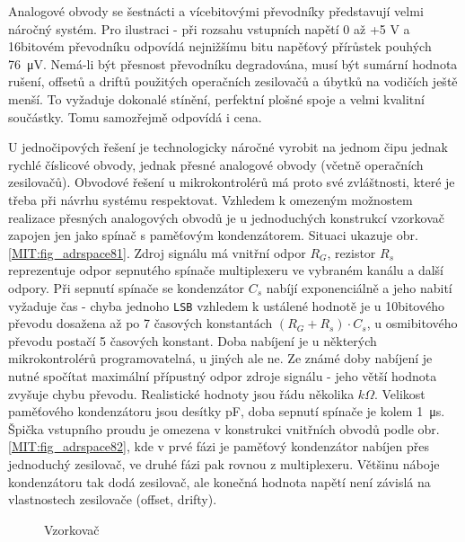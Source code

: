       Analogové obvody se šestnácti a vícebitovými převodníky představují velmi náročný systém. Pro 
      ilustraci - při rozsahu vstupních napětí 0 až +5 V a 16bitovém převodníku odpovídá nejnižšímu 
      bitu napěťový přírůstek pouhých \qty{76}{\micro\volt}. Nemá-li být přesnost převodníku 
      degradována, musí být sumární hodnota rušení, offsetů a driftů použitých operačních 
      zesilovačů a úbytků na vodičích ještě  menší. To vyžaduje dokonalé stínění, perfektní plošné 
      spoje a velmi kvalitní součástky. Tomu samozřejmě odpovídá i cena.
      
      U jednočipových řešení je technologicky náročné vyrobit na jednom čipu jednak rychlé 
      číslicové obvody, jednak přesné analogové obvody (včetně operačních zesilovačů). Obvodové 
      řešení u mikrokontrolérů má  proto své zvláštnosti, které je třeba při návrhu systému 
      respektovat. Vzhledem k omezeným možnostem  realizace přesných analogových obvodů je u 
      jednoduchých konstrukcí vzorkovač zapojen jen jako spínač s paměťovým kondenzátorem. Situaci 
      ukazuje obr. \ref{MIT:fig_adrspace81}. Zdroj signálu má vnitřní odpor \(R_G\), rezistor 
      \(R_s\) reprezentuje odpor sepnutého spínače multiplexeru ve vybraném kanálu a další 
      odpory. Při sepnutí spínače se kondenzátor \(C_s\) nabíjí exponenciálně a jeho nabití 
      vyžaduje čas - chyba jednoho \texttt{LSB} vzhledem k ustálené hodnotě je u 10bitového převodu 
      dosažena až po 7 časových konstantách \((R_G + R_s)\cdot C_s\), u osmibitového převodu 
      postačí 5 časových konstant. Doba nabíjení je u některých mikrokontrolérů programovatelná, u 
      jiných ale ne. Ze známé doby nabíjení je nutné spočítat maximální přípustný odpor zdroje 
      signálu - jeho větší hodnota zvyšuje chybu převodu. Realistické hodnoty jsou řádu několika 
      \(k\Omega\). Velikost paměťového kondenzátoru jsou desítky pF, doba sepnutí spínače je kolem 
      \qty{1}{\micro\second}. Špička vstupního proudu je omezena v konstrukci vnitřních obvodů podle 
      obr. \ref{MIT:fig_adrspace82}, kde v prvé fázi je paměťový kondenzátor nabíjen přes 
      jednoduchý zesilovač, ve druhé fázi pak rovnou z multiplexeru. Většinu náboje kondenzátoru 
      tak dodá zesilovač, ale konečná hodnota napětí není závislá na vlastnostech zesilovače 
      (offset, drifty).
       
      \begin{figure}[ht!]
        \centering  
          {}             
          {}              
        \caption{Vzorkovač}
        \label{MIT:fig_sbernice8182}
      \end{figure}
        

